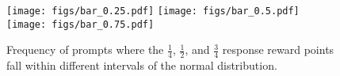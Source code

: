 \begin{figure}[!ht]
\centering
\texttt{[image: figs/bar\_0.25.pdf]}
\vspace{0.5em} %
\texttt{[image: figs/bar\_0.5.pdf]}
\vspace{0.5em} %
\texttt{[image: figs/bar\_0.75.pdf]}
\caption{Frequency of prompts where the $\frac{1}{4}$, $\frac{1}{2}$, and $\frac{3}{4}$ response reward points fall within different intervals of the normal distribution.}
\label{bar_freq}
\end{figure}
